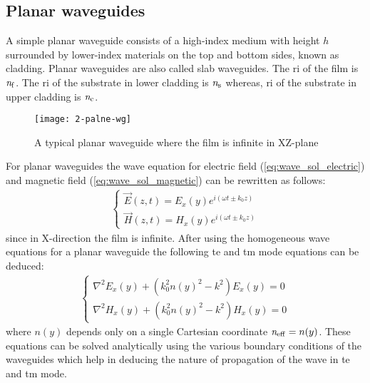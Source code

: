 \documentclass[../report.tex]{subfiles}
\begin{document}
		\subsection{Planar waveguides}
A simple planar waveguide consists of a high-index medium with height $h$ surrounded by lower-index materials on the top and bottom sides, known as cladding. Planar waveguides are also called slab waveguides. The \gls{ri} of the film is $\mathrm{\textit{n}_{f}}$. The \gls{ri} of the substrate in lower cladding is $\mathrm{\textit{n}_{s}}$ whereas, \gls{ri} of the substrate in upper cladding is $\mathrm{\textit{n}_{c}}$.
\begin{figure}[H]
	\centering
	\texttt{[image: 2-palne-wg]}
	\caption{A typical planar waveguide where the film is infinite in XZ-plane}
	\label{fig:2_palne_wg}
\end{figure}
For planar waveguides the wave equation for electric field (\ref{eq:wave_sol_electric}) and magnetic field (\ref{eq:wave_sol_magnetic}) can be rewritten as follows:
\begin{equation}\label{eq:wave_sol_planar_wg}
\begin{aligned}
\begin{cases}
\vec{E}(z,t)=E_{x}(y)e^{i\left(\omega t \pm k_{0}z\right)}\\
\vec{H}(z,t)=H_{x}(y)e^{i\left(\omega t \pm k_{0}z\right)}
\end{cases}
\end{aligned}
\end{equation}	
since in X-direction the film is infinite. After using the homogeneous wave equations for a planar waveguide the following \gls{te} and \gls{tm} mode equations can be deduced:
\begin{equation}\label{eq:homogeneous_wave_sol_planar_wg}
\begin{aligned}
\begin{cases}
\nabla^{2}E_x(y) + (k_{0}^{2}n(y)^{2}-k^{2}){E_{x}(y)} = 0\\
\nabla^{2}H_x(y) + (k_{0}^{2}n(y)^{2}-k^{2}){H_{x}(y)} = 0	
\end{cases}
\end{aligned}
\end{equation}
where $n(y)$ depends only on a single Cartesian coordinate $\mathrm{\textit{n}_{eff}} = n(y)$. These equations can be solved analytically using the various boundary conditions of the waveguides which help in deducing the nature of propagation of the wave in \gls{te} and \gls{tm} mode. 
\end{document}
